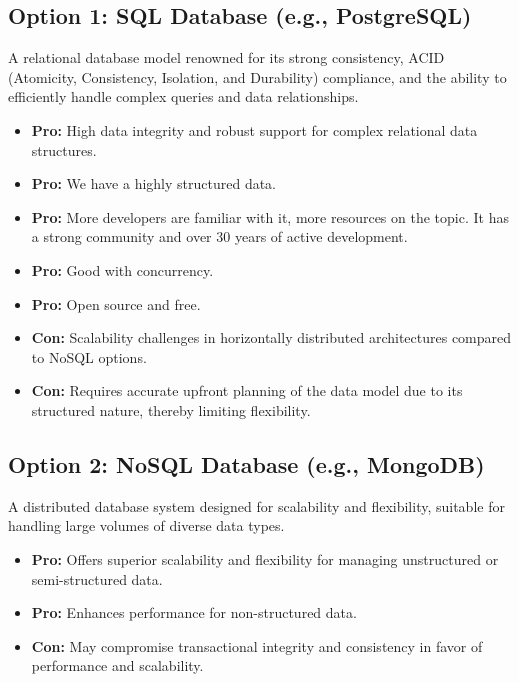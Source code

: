 \subsection*{Option 1: SQL Database (e.g., PostgreSQL)}
A relational database model renowned for its strong consistency, ACID (Atomicity, Consistency, Isolation, and Durability) compliance, and the ability to efficiently handle complex queries and data relationships.
\begin{itemize}
    \item \textbf{Pro:} High data integrity and robust support for complex relational data structures.
    \item \textbf{Pro:} We have a highly structured data.
    \item \textbf{Pro:} More developers are familiar with it, more resources on the topic. It has a strong community and over 30 years of active development.
    \item \textbf{Pro:} Good with concurrency.
    \item \textbf{Pro:} Open source and free.
    \item \textbf{Con:} Scalability challenges in horizontally distributed architectures compared to NoSQL options.
    \item \textbf{Con:} Requires accurate upfront planning of the data model due to its structured nature, thereby limiting flexibility.
\end{itemize}

\subsection*{Option 2: NoSQL Database (e.g., MongoDB)}
A distributed database system designed for scalability and flexibility, suitable for handling large volumes of diverse data types.
\begin{itemize}
    \item \textbf{Pro:} Offers superior scalability and flexibility for managing unstructured or semi-structured data.
    \item \textbf{Pro:} Enhances performance for non-structured data.
    \item \textbf{Con:} May compromise transactional integrity and consistency in favor of performance and scalability.
\end{itemize}

